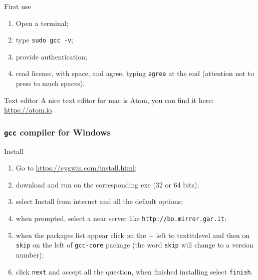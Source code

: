 \begin{frame}
    \begin{block}{First use}
    \begin{enumerate}
    \item Open a terminal;
    \item type \alert{\texttt{sudo gcc -v}};
    \item provide authentication;
    \item read license, with \alert{space}, and agree, typing
      \alert{\texttt{agree}} at the end (attention not to press to
      much spaces).
    \end{enumerate}
  \end{block}
  \begin{block}{Text editor}
    A nice text editor for mac is \alert{Atom}, you can find it here:
    \url{https://atom.io}.
  \end{block}
\end{frame}

\begin{frame}
  \frametitle{\texttt{gcc} compiler for Windows}
  \begin{block}{Install}
    \begin{enumerate}
    \item Go to \url{https://cygwin.com/install.html};
    \item download and run on the corresponding \alert{exe} (32 or 64
      bits);
    \item select \alert{Install from internet} and all the default
      options;
    \item when prompted, select a near server like
      \alert{\texttt{http://bo.mirror.gar.it}};
    \item when the packages list appear click on the + left to
      \alert{texttt{devel}} and then on \alert{\texttt{skip}} on the
      left of \alert{\texttt{gcc-core}} package (the word
      \texttt{skip} will change to a version number);
    \item click \alert{\texttt{next}} and accept all the question,
      when finished installing select \alert{\texttt{finish}}.
    \end{enumerate}
  \end{block}
\end{frame}


